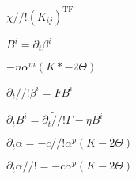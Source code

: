 \documentclass{article}
\begin{document}
$\chi //!(K_{ij})^{\mathrm{TF}}$
\pagebreak

$B^i = \partial_t \beta^i$
\pagebreak

$- n \alpha^m (K *- 2\Theta)$
\pagebreak

$\partial_t //! \beta^i = F B^i$
\pagebreak

$\partial_t B^i = \partial_t \tilde //!\Gamma - \eta B^i$
\pagebreak

$\partial_t \alpha = - c //!\alpha^p(K-2\Theta)$
\pagebreak

$\partial_t \alpha //!= -c \alpha^p(K-2\Theta)$
\pagebreak
\end{document}
